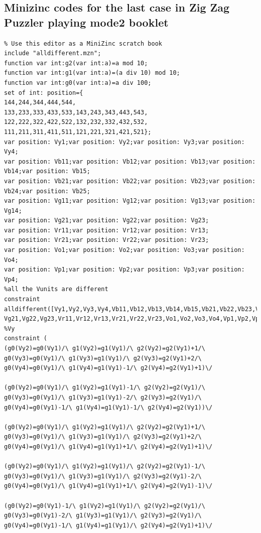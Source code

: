 \begin{appendices}
\section{Minizinc codes for the last case in Zig Zag Puzzler playing mode2 booklet}
\label{appendix:lastcaseinmode2}
\begin{lstlisting}
% Use this editor as a MiniZinc scratch book
include "alldifferent.mzn";
function var int:g2(var int:a)=a mod 10;
function var int:g1(var int:a)=(a div 10) mod 10;
function var int:g0(var int:a)=a div 100;
set of int: position={
144,244,344,444,544,
133,233,333,433,533,143,243,343,443,543,
122,222,322,422,522,132,232,332,432,532,
111,211,311,411,511,121,221,321,421,521};
var position: Vy1;var position: Vy2;var position: Vy3;var position: Vy4;
var position: Vb11;var position: Vb12;var position: Vb13;var position: Vb14;var position: Vb15;
var position: Vb21;var position: Vb22;var position: Vb23;var position: Vb24;var position: Vb25;
var position: Vg11;var position: Vg12;var position: Vg13;var position: Vg14;
var position: Vg21;var position: Vg22;var position: Vg23;
var position: Vr11;var position: Vr12;var position: Vr13;
var position: Vr21;var position: Vr22;var position: Vr23;
var position: Vo1;var position: Vo2;var position: Vo3;var position: Vo4;
var position: Vp1;var position: Vp2;var position: Vp3;var position: Vp4;
%all the Vunits are different
constraint alldifferent([Vy1,Vy2,Vy3,Vy4,Vb11,Vb12,Vb13,Vb14,Vb15,Vb21,Vb22,Vb23,Vb24,Vb25,Vg11,Vg12,Vg13,Vg14,
Vg21,Vg22,Vg23,Vr11,Vr12,Vr13,Vr21,Vr22,Vr23,Vo1,Vo2,Vo3,Vo4,Vp1,Vp2,Vp3,Vp4]);
%Vy
constraint (
(g0(Vy2)=g0(Vy1)/\ g1(Vy2)=g1(Vy1)/\ g2(Vy2)=g2(Vy1)+1/\ g0(Vy3)=g0(Vy1)/\ g1(Vy3)=g1(Vy1)/\ g2(Vy3)=g2(Vy1)+2/\ g0(Vy4)=g0(Vy1)/\ g1(Vy4)=g1(Vy1)-1/\ g2(Vy4)=g2(Vy1)+1)\/ 

(g0(Vy2)=g0(Vy1)/\ g1(Vy2)=g1(Vy1)-1/\ g2(Vy2)=g2(Vy1)/\ g0(Vy3)=g0(Vy1)/\ g1(Vy3)=g1(Vy1)-2/\ g2(Vy3)=g2(Vy1)/\ g0(Vy4)=g0(Vy1)-1/\ g1(Vy4)=g1(Vy1)-1/\ g2(Vy4)=g2(Vy1))\/ 

(g0(Vy2)=g0(Vy1)/\ g1(Vy2)=g1(Vy1)/\ g2(Vy2)=g2(Vy1)+1/\ g0(Vy3)=g0(Vy1)/\ g1(Vy3)=g1(Vy1)/\ g2(Vy3)=g2(Vy1)+2/\ g0(Vy4)=g0(Vy1)/\ g1(Vy4)=g1(Vy1)+1/\ g2(Vy4)=g2(Vy1)+1)\/ 

(g0(Vy2)=g0(Vy1)/\ g1(Vy2)=g1(Vy1)/\ g2(Vy2)=g2(Vy1)-1/\ g0(Vy3)=g0(Vy1)/\ g1(Vy3)=g1(Vy1)/\ g2(Vy3)=g2(Vy1)-2/\ g0(Vy4)=g0(Vy1)/\ g1(Vy4)=g1(Vy1)+1/\ g2(Vy4)=g2(Vy1)-1)\/ 

(g0(Vy2)=g0(Vy1)-1/\ g1(Vy2)=g1(Vy1)/\ g2(Vy2)=g2(Vy1)/\ g0(Vy3)=g0(Vy1)-2/\ g1(Vy3)=g1(Vy1)/\ g2(Vy3)=g2(Vy1)/\ g0(Vy4)=g0(Vy1)-1/\ g1(Vy4)=g1(Vy1)/\ g2(Vy4)=g2(Vy1)+1)\/ 


\end{lstlisting}
\end{appendices}
